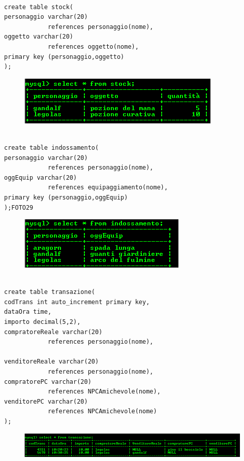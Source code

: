 \begin{verbatim}

create table stock( 
personaggio varchar(20) 
			references personaggio(nome), 
oggetto varchar(20)
			references oggetto(nome),
primary key (personaggio,oggetto)
);
\end{verbatim}

\begin{figure}[H]
\centering
\includegraphics[width=0.7\linewidth]{immagini/26}
\caption{}
\label{fig:1}
\end{figure}

\begin{verbatim}

create table indossamento( 
personaggio varchar(20) 
			references personaggio(nome), 
oggEquip varchar(20) 
			references equipaggiamento(nome),
primary key (personaggio,oggEquip)
);FOTO29
\end{verbatim}

\begin{figure}[H]
\centering
\includegraphics[width=0.7\linewidth]{immagini/27}
\caption{}
\label{fig:1}
\end{figure}

\begin{verbatim}

create table transazione(
codTrans int auto_increment primary key,
dataOra time, 
importo decimal(5,2), 
compratoreReale varchar(20) 
			references personaggio(nome), 

venditoreReale varchar(20) 
			references personaggio(nome), 
compratorePC varchar(20) 
			references NPCAmichevole(nome), 
venditorePC varchar(20) 
			references NPCAmichevole(nome)
);

\end{verbatim}

\begin{figure}[H]
\centering
\includegraphics[width=0.7\linewidth]{immagini/28}
\caption{}
\label{fig:1}
\end{figure}

